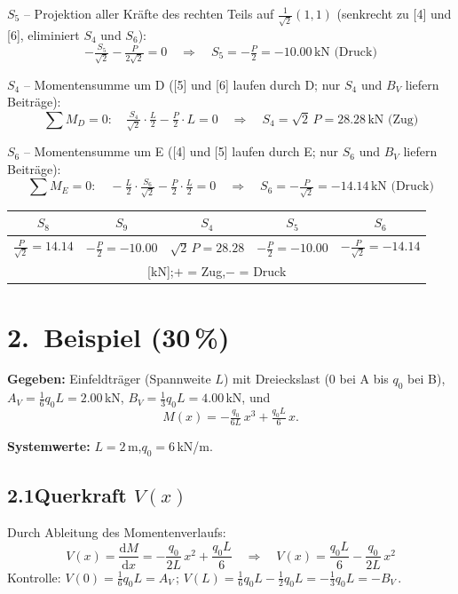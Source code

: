 \documentclass[a4paper,11pt]{article}
\begin{document}
\textbf{$S_5$} -- Projektion aller Kräfte des rechten Teils auf $\tfrac{1}{\sqrt{2}}(1,1)$
(senkrecht zu [4] und [6], eliminiert $S_4$ und $S_6$):
\[
  -\tfrac{S_5}{\sqrt{2}} - \tfrac{P}{2\sqrt{2}} = 0
  \quad\Rightarrow\quad \boxed{S_5 = -\tfrac{P}{2} = -10.00\,\text{kN (Druck)}}
\]

\textbf{$S_4$} -- Momentensumme um D
([5] und [6] laufen durch D; nur $S_4$ und $B_V$ liefern Beiträge):
\[
  \sum M_D = 0:\quad \tfrac{S_4}{\sqrt{2}}\cdot\tfrac{L}{2} - \tfrac{P}{2}\cdot L = 0
  \quad\Rightarrow\quad \boxed{S_4 = \sqrt{2}\,P = 28.28\,\text{kN (Zug)}}
\]

\textbf{$S_6$} -- Momentensumme um E
([4] und [5] laufen durch E; nur $S_6$ und $B_V$ liefern Beiträge):
\[
  \sum M_E = 0:\quad -\tfrac{L}{2}\cdot\tfrac{S_6}{\sqrt{2}} - \tfrac{P}{2}\cdot\tfrac{L}{2} = 0
  \quad\Rightarrow\quad \boxed{S_6 = -\tfrac{P}{\sqrt{2}} = -14.14\,\text{kN (Druck)}}
\]

\medskip
\begin{center}
\begin{tabular}{ccccc}
\toprule
$S_8$ & $S_9$ & $S_4$ & $S_5$ & $S_6$ \\
\midrule
$\tfrac{P}{\sqrt{2}} = 14.14$ & $-\tfrac{P}{2} = -10.00$ &
$\sqrt{2}\,P = 28.28$ & $-\tfrac{P}{2} = -10.00$ & $-\tfrac{P}{\sqrt{2}} = -14.14$ \\
\multicolumn{5}{c}{\small [kN];\quad $+$ = Zug,\quad $-$ = Druck} \\
\bottomrule
\end{tabular}
\end{center}

\newpage
\section*{2.~Beispiel \hfill (30\,\%)}

\textbf{Gegeben:} Einfeldträger (Spannweite $L$) mit Dreieckslast
(0 bei A bis $q_0$ bei B),
$A_V = \tfrac{1}{6}q_0 L = 2.00$\,kN,
$B_V = \tfrac{1}{3}q_0 L = 4.00$\,kN, und
\[
  M(x) = -\tfrac{q_0}{6L}\,x^3 + \tfrac{q_0 L}{6}\,x.
\]

\textbf{Systemwerte:} $L = 2$\,m,\quad $q_0 = 6$\,kN/m.

\subsection*{2.1\quad Querkraft $V(x)$}

Durch Ableitung des Momentenverlaufs:
\[
  V(x) = \frac{\mathrm{d}M}{\mathrm{d}x}
        = -\frac{q_0}{2L}\,x^2 + \frac{q_0 L}{6}
  \quad\Rightarrow\quad
  \boxed{V(x) = \frac{q_0 L}{6} - \frac{q_0}{2L}\,x^2}
\]
Kontrolle: $V(0) = \tfrac{1}{6}q_0 L = A_V$\,\checkmark;\quad
$V(L) = \tfrac{1}{6}q_0 L - \tfrac{1}{2}q_0 L = -\tfrac{1}{3}q_0 L = -B_V$\,\checkmark.
\end{document}
